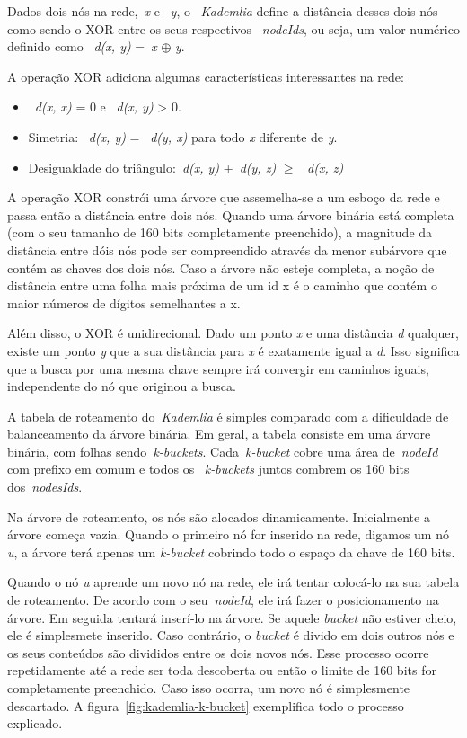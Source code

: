 Dados dois nós na rede,~\emph{x} e ~\emph{y}, o ~\emph{Kademlia} define a distância desses dois nós como sendo o XOR entre os seus respectivos ~\emph{nodeIds}, ou seja, um valor numérico definido como ~\emph{d(x, y)} =~\emph{x} $\oplus$ \emph{y}.

A operação XOR adiciona algumas características interessantes na rede:
\begin{itemize}
	\item ~\emph{d(x, x)} = 0 e ~\emph{d(x, y)} > 0.
	\item Simetria: ~\emph{d(x, y)} = ~\emph{d(y, x)} para todo \emph{x} diferente de \emph{y}.
	\item Desigualdade do triângulo:~\emph{d(x, y)} +~\emph{d(y, z)} $\ge$ ~\emph{d(x, z)}
\end{itemize}

A operação XOR constrói uma árvore que assemelha-se a um esboço da rede e passa então a distância entre dois nós. Quando uma árvore binária está completa (com o seu tamanho de 160 bits completamente preenchido), a magnitude da distância entre dóis nós pode ser compreendido através da menor subárvore que contém as chaves dos dois nós. Caso a árvore não esteje completa, a noção de distância entre uma folha mais próxima de um id x é o caminho que contém o maior números de dígitos semelhantes a x.

Além disso, o XOR é unidirecional. Dado um ponto \emph{x} e uma distância \emph{d} qualquer, existe um ponto \emph{y} que a sua distância para \emph{x} é exatamente igual a \emph{d}. Isso significa que a busca por uma mesma chave sempre irá convergir em caminhos iguais, independente do nó que originou a busca.

A tabela de roteamento do~\emph{Kademlia} é simples comparado com a dificuldade de balanceamento da árvore binária. Em geral, a tabela consiste em uma árvore binária, com folhas sendo~\emph{k-buckets}. Cada~\emph{k-bucket} cobre uma área de~\emph{nodeId} com prefixo em comum e todos os ~\emph{k-buckets} juntos combrem os 160 bits dos~\emph{nodesIds}.

Na árvore de roteamento, os nós são alocados dinamicamente. Inicialmente a árvore começa vazia. Quando o primeiro nó for inserido na rede, digamos um nó \emph{u}, a árvore terá apenas um \emph{k-bucket} cobrindo todo o espaço da chave de 160 bits.

Quando o nó \emph{u} aprende um novo nó na rede, ele irá tentar colocá-lo na sua tabela de roteamento. De acordo com o seu~\emph{nodeId}, ele irá fazer o posicionamento na árvore. Em seguida tentará inserí-lo na árvore. Se aquele \emph{bucket} não estiver cheio, ele é simplesmete inserido. Caso contrário, o \emph{bucket} é divido em dois outros nós e os seus conteúdos são divididos entre os dois novos nós. Esse processo ocorre repetidamente até a rede ser toda descoberta ou então o limite de 160 bits for completamente preenchido. Caso isso ocorra, um novo nó é simplesmente descartado. A figura~\ref{fig:kademlia-k-bucket} exemplifica todo o processo explicado.

